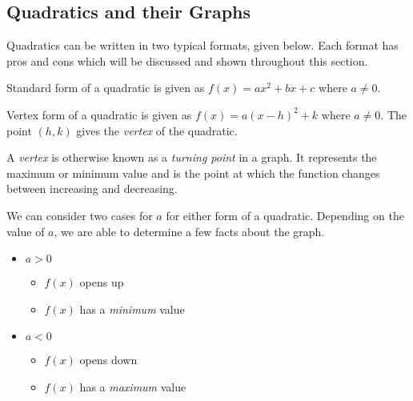 \documentclass[addpoints,12pt]{exam}
\theoremstyle{definition}
\theoremstyle{break}
\theoremstyle{break}
\begin{document}
\setcounter{section}{11}
\setcounter{subsection}{2}

\subsection{Quadratics and their Graphs}

Quadratics can be written in two typical formats, given below. Each format has pros and cons which will be discussed and shown throughout this section.
\vspace{.15in}

\begin{definition}
Standard form of a quadratic is given as $f(x) = ax^2 + bx + c$ where $a\neq 0$.
\end{definition}
\vspace{.15in}

\begin{definition}
Vertex form of a quadratic is given as $f(x) = a(x-h)^2 + k$ where $a\neq 0$. The point $(h,k)$ gives the \emph{vertex} of the quadratic.
\end{definition}

\vspace{.15in}

\begin{definition}[Vertex]
A \emph{vertex} is otherwise known as a \emph{turning point} in a graph. It represents the maximum or minimum value and is the point at which the function changes between increasing and decreasing.
\end{definition}

\vspace{.15in}

We can consider two cases for $a$ for either form of a quadratic. Depending on the value of $a$, we are able to determine a few facts about the graph.
\vspace{.15in}
\begin{itemize}
\item $a > 0$
\begin{itemize}
\item $f(x)$ opens up
\item $f(x)$ has a \emph{minimum} value
\end{itemize}
\item $a < 0$
\begin{itemize}
\item $f(x)$ opens down
\item $f(x)$ has a \emph{maximum} value
\end{itemize}
\end{itemize}
\end{document}
